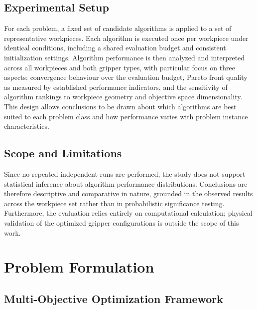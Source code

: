 \subsection{Experimental Setup}
\label{subsec:experimental_setup}

For each problem, a fixed set of candidate algorithms is applied to a set of representative workpieces. Each algorithm is executed once per workpiece
under identical conditions, including a shared evaluation budget and consistent initialization settings\cite{DaSilva2024Multi-objective}. Algorithm
performance is then analyzed and interpreted across all workpieces and both gripper types, with particular focus on three aspects: convergence
behaviour over the evaluation budget, Pareto front quality as measured by established performance indicators, and the sensitivity of algorithm
rankings to workpiece geometry and objective space dimensionality\cite{Audet2018Performance}. This design allows conclusions to be drawn about which
algorithms are best suited to each problem class and how performance varies with problem instance characteristics\cite{Nikolikj2025Benchmarking}.

\subsection{Scope and Limitations}
\label{subsec:scope_limitations}

Since no repeated independent runs are performed, the study does not support statistical inference about algorithm performance distributions.
Conclusions are therefore descriptive and comparative in nature, grounded in the observed results across the workpiece set rather than in
probabilistic significance testing. Furthermore, the evaluation relies entirely on computational calculation; physical validation of the optimized
gripper configurations is outside the scope of this work.

\section{Problem Formulation}
\label{sec:methodology_problem_formulation}

\subsection{Multi-Objective Optimization Framework}
\label{subsec:methodology_moo}


